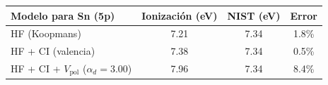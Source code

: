 \begin{tabular}{lccc}
    \toprule
    \textbf{Modelo para Sn (5p)} & \textbf{Ionización (eV)} & \textbf{NIST (eV)} & \textbf{Error} \\
    \midrule
    HF (Koopmans) & 7.21 & 7.34 & 1.8\% \\
    HF + CI (valencia) & 7.38 & 7.34 & 0.5\% \\
    HF + CI + $V_{\text{pol}}$ ($\alpha_d = 3.00$) & 7.96 & 7.34 & 8.4\% \\
    \bottomrule
\end{tabular}
